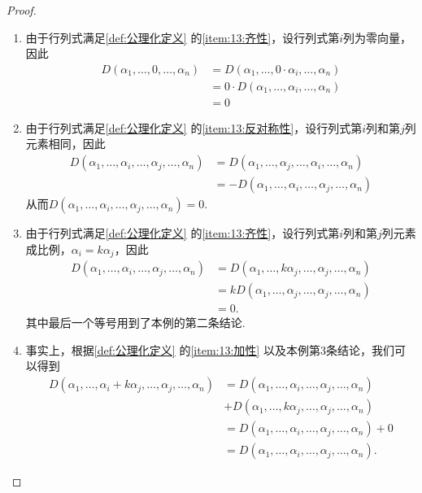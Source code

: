 \begin{proof}
    \begin{enumerate}
        \item 由于行列式满足\autoref{def:公理化定义} 的\ref*{item:13:齐性}，设行列式第$i$列为零向量，因此
              \begin{align*}
                  D(\alpha_1,\ldots,0,\ldots,\alpha_n) & =D(\alpha_1,\ldots,0\cdot\alpha_i,\ldots,\alpha_n)  \\
                                                       & =0\cdot D(\alpha_1,\ldots,\alpha_i,\ldots,\alpha_n) \\
                                                       & =0
              \end{align*}

        \item 由于行列式满足\autoref{def:公理化定义} 的\ref*{item:13:反对称性}，设行列式第$i$列和第$j$列元素相同，因此
              \begin{align*}
                  D(\alpha_1,\ldots,\alpha_i,\ldots,\alpha_j,\ldots,\alpha_n) & =D(\alpha_1,\ldots,\alpha_j,\ldots,\alpha_i,\ldots,\alpha_n)  \\
                                                                              & =-D(\alpha_1,\ldots,\alpha_i,\ldots,\alpha_j,\ldots,\alpha_n)
              \end{align*}
              从而$D(\alpha_1,\ldots,\alpha_i,\ldots,\alpha_j,\ldots,\alpha_n)=0$.

        \item 由于行列式满足\autoref{def:公理化定义} 的\ref*{item:13:齐性}，设行列式第$i$列和第$j$列元素成比例，$\alpha_i=k\alpha_j$，因此
              \begin{align*}
                  D(\alpha_1,\ldots,\alpha_i,\ldots,\alpha_j,\ldots,\alpha_n)
                   & =D(\alpha_1,\ldots,k\alpha_j,\ldots,\alpha_j,\ldots,\alpha_n) \\
                   & =kD(\alpha_1,\ldots,\alpha_j,\ldots,\alpha_j,\ldots,\alpha_n) \\
                   & =0.
              \end{align*}
              其中最后一个等号用到了本例的第二条结论.

        \item 事实上，根据\autoref{def:公理化定义} 的\ref*{item:13:加性} 以及本例第3条结论，我们可以得到
              \begin{align*}
                  D(\alpha_1,\ldots,\alpha_i+k\alpha_j,\ldots,\alpha_j,\ldots,\alpha_n)
                   & =D(\alpha_1,\ldots,\alpha_i,\ldots,\alpha_j,\ldots,\alpha_n)   \\&+D(\alpha_1,\ldots,k\alpha_j,\ldots,\alpha_j,\ldots,\alpha_n) \\
                   & =D(\alpha_1,\ldots,\alpha_i,\ldots,\alpha_j,\ldots,\alpha_n)+0 \\
                   & =D(\alpha_1,\ldots,\alpha_i,\ldots,\alpha_j,\ldots,\alpha_n).
              \end{align*}


\end{enumerate}
\end{proof}
